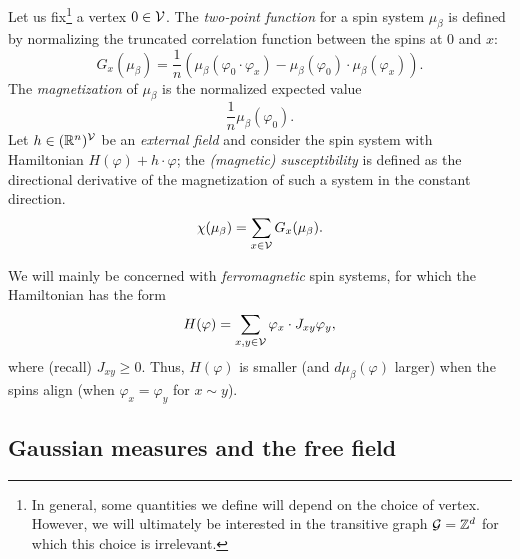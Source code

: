 Let us fix\footnote{In general, some quantities we define will depend on the choice of vertex. However, we will ultimately be interested in the transitive graph $\mathcal{G} = { {{\mathbb Z}}^d }$ for which this choice is irrelevant.} a vertex
$0 \in \mathcal{V}$. The \emph{two-point function} for a spin system $\mu_\beta$ is defined by normalizing the truncated correlation function between the spins at $0$ and $x$:
\begin{equation}
G_x(\mu_\beta)
  =
\frac{1}{n}
(\mu_\beta(\varphi_0 \cdot \varphi_x)
  -
\mu_\beta(\varphi_0) \cdot \mu_\beta(\varphi_x)).
\end{equation}
The \emph{magnetization} of $\mu_\beta$ is the normalized expected value
\begin{equation}
\frac{1}{n} \mu_\beta(\varphi_0).
\end{equation}
Let $h \in ({\mathbb R}^n)^{\mathcal{V}}$ be an \emph{external field} and consider the spin system with Hamiltonian $H(\varphi) + h \cdot \varphi$;
the \emph{(magnetic) susceptibility} is defined as the directional derivative of the magnetization of such a system in the constant direction. 
\begin{equation}
\chi(\mu_\beta) = \sum_{x\in\mathcal{V}} G_x(\mu_\beta).
\end{equation}

We will mainly be concerned with \emph{ferromagnetic} spin systems, for which the Hamiltonian has the form
\begin{equation}
H(\varphi) = \sum_{x, y \in \mathcal{V}} \varphi_x \cdot J_{xy} \varphi_y,
\end{equation}
where (recall) $J_{xy} \ge 0$. Thus, $H(\varphi)$ is smaller (and $d\mu_\beta(\varphi)$ larger) when the spins align (when $\varphi_x = \varphi_y$ for $x \sim y$).


\subsection{Gaussian measures and the free field}

